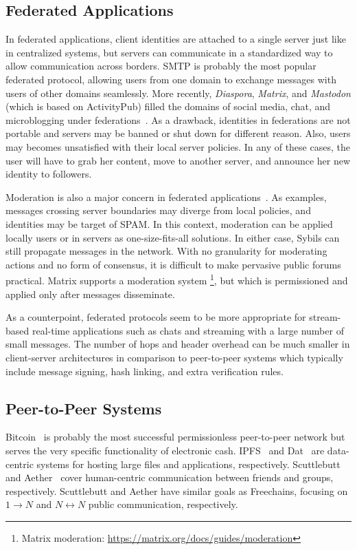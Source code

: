 \documentclass[10pt,journal,compsoc]{IEEEtran}
\newcommand{\FC}       {Freechains\xspace}
\newcommand{\Xon} {$1{\rightarrow}N$\xspace}
\newcommand{\Xnn} {$N{\leftrightarrow}N$\xspace}
\begin{document}
\subsection{Federated Applications}

In federated applications, client identities are attached to a single server
just like in centralized systems, but servers can communicate in a standardized
way to allow communication across borders.
SMTP is probably the most popular federated protocol, allowing users from one
domain to exchange messages with users of other domains seamlessly.
More recently, \emph{Diaspora}, \emph{Matrix}, and \emph{Mastodon} (which is
based on ActivityPub) filled the domains of social media, chat, and
microblogging under federations~\cite{p2p.ecosystem}.
%
As a drawback, identities in federations are not portable and servers may be
banned or shut down for different reason.
Also, users may becomes unsatisfied with their local server policies.
In any of these cases, the user will have to grab her content, move to another
server, and announce her new identity to followers.

Moderation is also a major concern in federated
applications~\cite{p2p.ecosystem}.
As examples, messages crossing server boundaries may diverge from local
policies, and identities may be target of SPAM.
In this context, moderation can be applied locally users or in servers as
one-size-fits-all solutions.
In either case, Sybils can still propagate messages in the network.
With no granularity for moderating actions and no form of consensus, it is
difficult to make pervasive public forums practical.
%
Matrix supports a moderation system%
\footnote{Matrix moderation: \url{https://matrix.org/docs/guides/moderation}},
but which is permissioned and applied only after messages disseminate.

As a counterpoint, federated protocols seem to be more appropriate for
stream-based real-time applications such as chats and streaming with a large
number of small messages.
The number of hops and header overhead can be much smaller in client-server
architectures in comparison to peer-to-peer systems which typically include
message signing, hash linking, and extra verification rules.

\subsection{Peer-to-Peer Systems}

Bitcoin~\cite{p2p.bitcoin} is probably the most successful permissionless
peer-to-peer network but serves the very specific functionality of electronic
cash.
IPFS~\cite{p2p.ipfs} and Dat~\cite{p2p.dat} are data-centric systems for
hosting large files and applications, respectively.
Scuttlebutt~\cite{p2p.scuttlebutt} and Aether~\cite{p2p.ecosystem} cover
human-centric communication between friends and groups, respectively.
Scuttlebutt and Aether have similar goals as \FC, focusing on \Xon and \Xnn
public communication, respectively.
\end{document}
